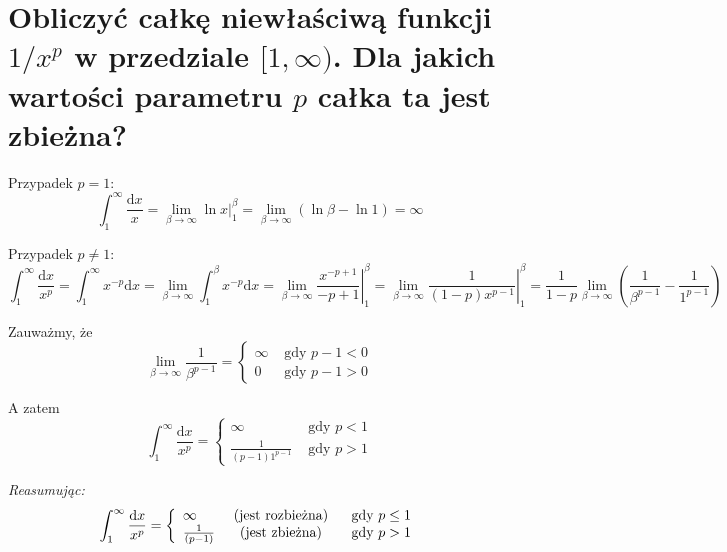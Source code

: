 \documentclass{article}
\numberwithin{equation}{section}
\theoremstyle{definition}
\theoremstyle{case}
\begin{document}
\section{Obliczyć całkę niewłaściwą funkcji
	\texorpdfstring{$ 1 / x^p $}{1/x\textasciicircum p}
	w przedziale
	\texorpdfstring{$ [ 1, \infty ) $}{[1,inf)}. %
	Dla jakich wartości parametru $p$ całka ta jest zbieżna?
}
Przypadek $p=1$:
\begin{equation*}
	\int_1^\infty \frac{\mathrm{d}x}{x}
	= \lim_{\beta \to \infty} \left. \ln x \right|_1^{\beta}
	= \lim_{\beta \to \infty} (\ln \beta -\ln 1)
	= \infty
\end{equation*}

Przypadek $p\neq 1$:
\begin{equation*}
	\int_1^{\infty}\frac{\mathrm{d}x}{x^p}
	= \int_1^{\infty} x^{-p} \mathrm{d}x
	= \lim_{\beta \to \infty}\int_1^\beta x^{-p} \mathrm{d}x
	= \lim_{\beta \to \infty} \left. \frac{x^{-p+1}}{-p+1} \right|_1^\beta
	= \lim_{\beta \to \infty} \left. \frac{1}{(1-p)x^{p-1}} \right|_1^\beta
	= \frac{1}{1-p} \lim_{\beta \to \infty} \left( \frac{1}{\beta^{p-1}} - \frac{1}{1^{p-1}} \right)
\end{equation*}

Zauważmy, że
\begin{equation*}
	\lim_{\beta \to \infty} \frac{1}{\beta^{p-1}}
	= \left\{
		\begin{array}{ll}
			\infty & \text{ gdy } p-1< 0
			\\ 0 & \text{ gdy } p-1> 0
		\end{array}
	\right. %
\end{equation*}

A zatem
\begin{equation*}
	\int_1^\infty \frac{\mathrm{d}x}{x^p}
	= \left\{
		\begin{array}{ll}
			\infty & \text{ gdy } p< 1
			\\ \frac{1}{(p-1)1^{p-1}} & \text{ gdy } p> 1
		\end{array}
	\right. %
\end{equation*}

\textit{Reasumując:}
\begin{equation*}
	\int_1^\infty \frac{\mathrm{d}x}{x^p}
	= \left\{
		\begin{array}{lcl}
			\infty & \textnormal{ (jest rozbieżna) } & \text{ gdy } p\leq1
			\\ \frac{1}{(p-1)} & \textnormal{ (jest zbieżna) } & \text{ gdy } p>1
		\end{array}
	\right. %
\end{equation*}
\end{document}
